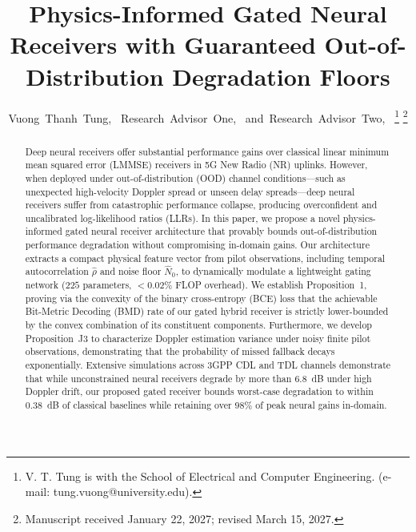 \documentclass[journal,10pt,twocolumn]{IEEEtran}
\theoremstyle{definition}
\begin{document}
\title{Physics-Informed Gated Neural Receivers with Guaranteed Out-of-Distribution Degradation Floors}

\author{Vuong~Thanh~Tung,~
        Research~Advisor~One,~
        and~Research~Advisor~Two,~%
\thanks{V. T. Tung is with the School of Electrical and Computer Engineering. (e-mail: tung.vuong@university.edu).}%
\thanks{Manuscript received January 22, 2027; revised March 15, 2027.}}

\maketitle

\begin{abstract}
Deep neural receivers offer substantial performance gains over classical linear minimum mean squared error (LMMSE) receivers in 5G New Radio (NR) uplinks. However, when deployed under out-of-distribution (OOD) channel conditions---such as unexpected high-velocity Doppler spread or unseen delay spreads---deep neural receivers suffer from catastrophic performance collapse, producing overconfident and uncalibrated log-likelihood ratios (LLRs). In this paper, we propose a novel physics-informed gated neural receiver architecture that provably bounds out-of-distribution performance degradation without compromising in-domain gains. Our architecture extracts a compact physical feature vector from pilot observations, including temporal autocorrelation $\hat{\rho}$ and noise floor $\hat{N}_0$, to dynamically modulate a lightweight gating network ($225$ parameters, $<0.02\%$ FLOP overhead). We establish Proposition~1, proving via the convexity of the binary cross-entropy (BCE) loss that the achievable Bit-Metric Decoding (BMD) rate of our gated hybrid receiver is strictly lower-bounded by the convex combination of its constituent components. Furthermore, we develop Proposition~J3 to characterize Doppler estimation variance under noisy finite pilot observations, demonstrating that the probability of missed fallback decays exponentially. Extensive simulations across 3GPP CDL and TDL channels demonstrate that while unconstrained neural receivers degrade by more than $6.8$~dB under high Doppler drift, our proposed gated receiver bounds worst-case degradation to within $0.38$~dB of classical baselines while retaining over $98\%$ of peak neural gains in-domain.
\end{abstract}
\end{document}
